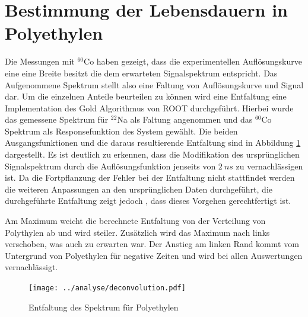 \documentclass[a4paper,12pt]{article}
\begin{document}
\section{Bestimmung der Lebensdauern in Polyethylen}\label{cap:poly}
Die Messungen mit $^{60}$Co haben gezeigt, dass die experimentellen Auflösungskurve eine eine Breite besitzt die dem erwarteten Signalspektrum entspricht. Das Aufgenommene Spektrum
stellt also eine Faltung von Auflösungskurve und Signal dar. Um die einzelnen Anteile beurteilen zu
können wird eine Entfaltung eine Implementation des Gold Algorithmus\cite{gold_algo} von ROOT\cite{root} durchgeführt.
Hierbei wurde das gemessene Spektrum für $^{22}$Na als Faltung angenommen und das $^{60}$Co Spektrum als Responsefunktion des System
gewählt. Die beiden Ausgangsfunktionen und die daraus resultierende Entfaltung sind in Abbildung \ref{fig:deconvolution} dargestellt. Es ist deutlich zu erkennen, dass die
Modifikation des ursprünglichen Signalspektrum durch die Auflösungsfunktion jenseits von $\SI{2}{ns}$ zu vernachlässigen ist. Da die Fortpflanzung der Fehler bei
der Entfaltung nicht stattfindet werden die weiteren Anpassungen an den ursprünglichen Daten durchgeführt, die durchgeführte Entfaltung zeigt jedoch
, dass dieses Vorgehen gerechtfertigt ist.

Am Maximum weicht die berechnete Entfaltung von der Verteilung von Polythylen ab und wird steiler.
Zusätzlich wird das Maximum nach links verschoben, was auch zu erwarten war.
Der Anstieg am linken Rand kommt vom Untergrund von Polyethylen für negative Zeiten und wird bei allen Auswertungen vernachlässigt.


\begin{figure}
	\texttt{[image: ../analyse/deconvolution.pdf]}
	\caption{Entfaltung des Spektrum für Polyethylen}
	\label{fig:deconvolution}
\end{figure}
\end{document}
